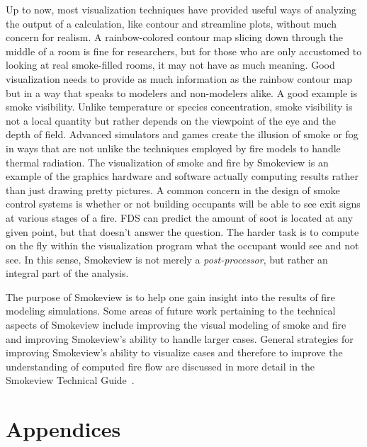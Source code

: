 \documentclass[11pt,twoside]{book}
\begin{document}
Up to now, most visualization techniques have provided useful ways
of analyzing the output of a calculation, like contour and
streamline plots, without much concern for realism. A
rainbow-colored contour map slicing down through the middle of a
room is fine for researchers, but for those who are only
accustomed to looking at real smoke-filled rooms, it may not have
as much meaning. Good visualization needs to provide as much
information as the rainbow contour map but in a way that speaks to
modelers and non-modelers alike. A good example is smoke
visibility. Unlike temperature or species concentration, smoke
visibility is not a local quantity but rather depends on the
viewpoint of the eye and the depth of field. Advanced simulators
and games create the illusion of smoke or fog in ways that are not
unlike the techniques employed by fire models to handle thermal
radiation. The visualization of smoke and fire by Smokeview is an
example of the graphics hardware and software actually computing
results rather than just drawing pretty pictures. A common concern
in the design of smoke control systems is whether or not building
occupants will be able to see exit signs at various stages of a
fire. FDS can predict the amount of soot is located at any given
point, but that doesn't answer the question. The harder task is to
compute on the fly within the visualization program what the
occupant would see and not see. In this sense, Smokeview is not
merely a {\em post-processor}, but rather an integral part of the
analysis.

The purpose of Smokeview is to help one gain insight into the results
of fire modeling simulations.
Some areas of future work pertaining to the technical aspects of Smokeview include improving the visual modeling of smoke and fire and improving Smokeview's ability to handle larger cases.
General strategies for improving Smokeview's ability to visualize cases and therefore to improve the understanding of computed fire flow are discussed in more detail in the Smokeview Technical Guide~\cite{Smokeview_Tech_Guide_5}.






\part{Appendices}
\appendix
{}
\end{document}
